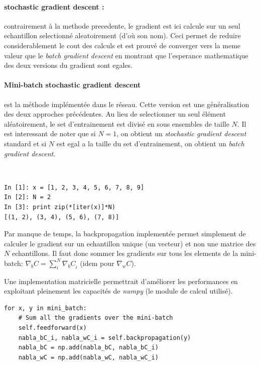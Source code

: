 \documentclass[11pt]{article}
\begin{document}
\paragraph{stochastic gradient descent : } contrairement \`a la methode
precedente, le gradient est ici calcule sur un seul echantillon selectionn\'e
aleatoirement (d'o\`u son nom). Ceci permet de reduire considerablement le
cout des calculs et est prouv\'e de converger vers la meme valeur que le
\emph{batch gradient descent} en montrant que l'esperance mathematique des deux
versions du gradient sont egales.

\paragraph{Mini-batch stochastic gradient descent} est la m\'ethode impl\'ement\'ee
dans le r\'eseau. Cette version est une g\'en\'eralisation des deux approches
pr\'ec\'edentes. Au lieu de selectionner un seul \'el\'ement al\'eatoirement,
le set d'entrainement est divis\'e en sous ensembles de taille $N$. Il est
interessant de noter que si $N=1$, on obtient un \emph{stochastic gradient descent}
standard et si $N$ est egal a la taille du set d'entrainement, on obtient un
\emph{batch gradient descent}.

 \\
\begin{lstlisting}
In [1]: x = [1, 2, 3, 4, 5, 6, 7, 8, 9]
In [2]: N = 2
In [3]: print zip(*[iter(x)]*N)
[(1, 2), (3, 4), (5, 6), (7, 8)]
\end{lstlisting}

Par manque de temps, la backpropagation implement\'ee permet simplement de
calculer le gradient sur un echantillon unique (un vecteur) et non une matrice
des $N$ echantillons. Il faut donc sommer les gradients sur tous les elements de
la mini-batch: $\nabla_bC = \sum_{i}^{N}{{\nabla_bC}_i}$ (idem pour $\nabla_wC$).

Une implementation matricielle permettrait d'am\'eliorer les performances en
exploitant pleinement les capacit\'es de \emph{numpy} (le module de calcul utilis\'e).
 \\
\begin{lstlisting}
for x, y in mini_batch:
	# Sum all the gradients over the mini-batch
	self.feedforward(x)
	nabla_bC_i, nabla_wC_i = self.backpropagation(y)
	nabla_bC = np.add(nabla_bC, nabla_bC_i)
	nabla_wC = np.add(nabla_wC, nabla_wC_i)
\end{lstlisting}
\end{document}
